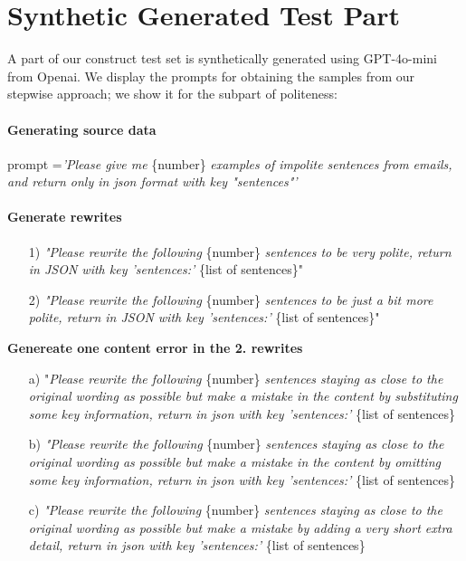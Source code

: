 \section{Synthetic Generated Test Part}
\label{app:syn}
A part of our construct test set is synthetically generated using GPT-4o-mini from Openai. We display the prompts for obtaining the samples from our stepwise approach; we show it for the subpart of politeness:
\paragraph{Generating source data} 

prompt =\textit{'Please give me} \{number\} \textit{examples of impolite sentences from emails, and return only in json format with key "sentences"'}

\paragraph{Generate rewrites}
\begin{itemize}
    \item[1)]  \textit{"Please rewrite the following} \{number\} \textit{sentences to be very polite, return in JSON with key  'sentences:'}  \{list of sentences\}"
    \item[2)]  \textit{"Please rewrite the following} \{number\} \textit{sentences to be just a bit more polite, return in JSON with key  'sentences:'}  \{list of sentences\}"
\end{itemize}
\textbf{Genereate one content error in the 2. rewrites }
\begin{itemize}
    \item[a)] "\textit{Please rewrite the following } \{number\} \textit{sentences staying as close to the original wording as possible but make a mistake in the content by substituting some key information, return in json with key  'sentences:'} \{list of sentences\}
\item[b)]  \textit{"Please rewrite the following }\{number\} \textit{sentences staying as close to the original wording as possible but make a mistake in the content by omitting some key information, return in json with key  'sentences:'} \{list of sentences\}
\item[c)]  \textit{"Please rewrite the following} \{number\} \textit{sentences staying as close to the original wording as possible but make a mistake by adding a very short extra detail, return in json with key  'sentences:'} \{list of sentences\}
\end{itemize}
